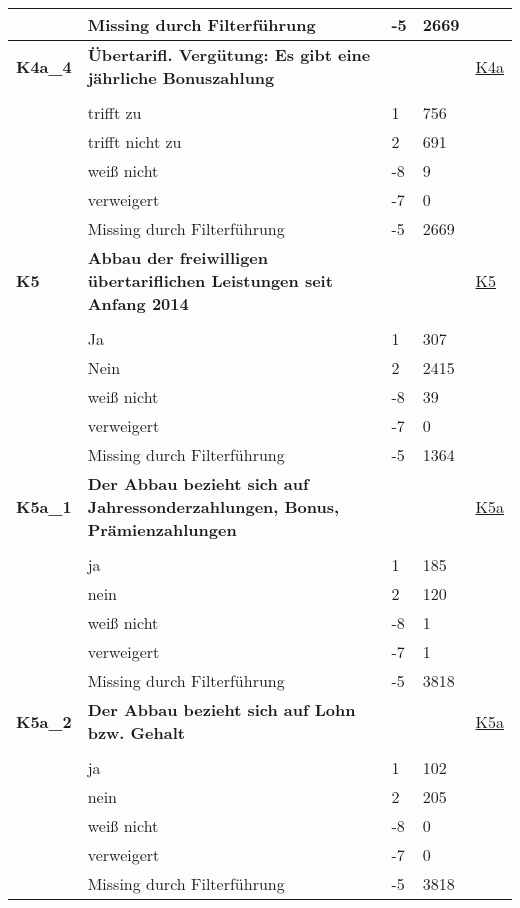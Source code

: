\begin{longtable}{| L{2.5cm} | L{8.25cm}| C{1.5cm} | R{1.25cm} | C{2.25cm} |  }
   & Missing durch Filterführung & -5 & 2669 &  \\ 
   \midrule
\textbf{K4a\_4}\label{var:suf:K4a:4} & \textbf{Übertarifl. Vergütung: Es gibt eine jährliche Bonuszahlung} &  &  & \hyperref[K4a]{K4a} \\ 
   &  &  &  &  \\ 
   & trifft zu & 1 & 756 &  \\ 
   & trifft nicht zu & 2 & 691 &  \\ 
   & weiß nicht & -8 & 9 &  \\ 
   & verweigert & -7 & 0 &  \\ 
   & Missing durch Filterführung & -5 & 2669 &  \\ 
   \midrule
\textbf{K5}\label{var:suf:K5} & \textbf{Abbau der freiwilligen übertariflichen Leistungen seit Anfang 2014} &  &  & \hyperref[K5]{K5} \\ 
   &  &  &  &  \\ 
   & Ja & 1 & 307 &  \\ 
   & Nein & 2 & 2415 &  \\ 
   & weiß nicht & -8 & 39 &  \\ 
   & verweigert & -7 & 0 &  \\ 
   & Missing durch Filterführung & -5 & 1364 &  \\ 
   \midrule
\textbf{K5a\_1}\label{var:suf:K5a:1} & \textbf{Der Abbau bezieht sich auf Jahressonderzahlungen, Bonus, Prämienzahlungen} &  &  & \hyperref[K5a]{K5a} \\ 
   &  &  &  &  \\ 
   & ja & 1 & 185 &  \\ 
   & nein & 2 & 120 &  \\ 
   & weiß nicht & -8 & 1 &  \\ 
   & verweigert & -7 & 1 &  \\ 
   & Missing durch Filterführung & -5 & 3818 &  \\ 
   \midrule
\textbf{K5a\_2}\label{var:suf:K5a:2} & \textbf{Der Abbau bezieht sich auf Lohn  bzw. Gehalt} &  &  & \hyperref[K5a]{K5a} \\ 
   &  &  &  &  \\ 
   & ja & 1 & 102 &  \\ 
   & nein & 2 & 205 &  \\ 
   & weiß nicht & -8 & 0 &  \\ 
   & verweigert & -7 & 0 &  \\ 
   & Missing durch Filterführung & -5 & 3818 &  \\ 

\end{longtable}
